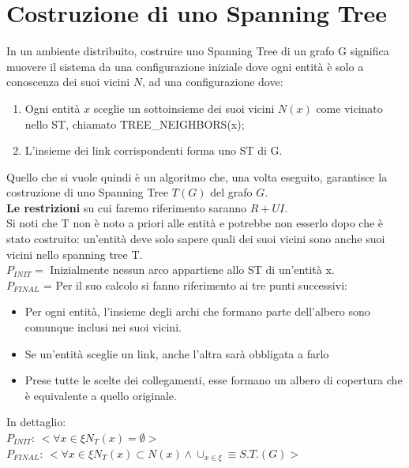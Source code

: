 \chapter{Costruzione di uno Spanning Tree}
In un ambiente distribuito, costruire uno Spanning Tree di un grafo G significa
muovere il sistema da una configurazione iniziale dove ogni entità è solo a
conoscenza dei suoi vicini $N$, ad una configurazione dove:

\begin{enumerate}
    \item Ogni entità $x$ sceglie un sottoinsieme dei suoi vicini $N(x)$ come
          vicinato nello ST, chiamato TREE\_NEIGHBORS(x);
    \item L'insieme dei link corrispondenti forma uno ST di G.
\end{enumerate}

Quello che si vuole quindi è un algoritmo che, una volta eseguito, garantisce la
costruzione di uno Spanning Tree $T(G)$ del grafo $G$.\\
\textbf{Le restrizioni} su cui faremo riferimento saranno $R+UI$.\\
Si noti che T non è noto a priori alle entità e potrebbe non esserlo dopo che è
stato costruito: un'entità deve solo sapere quali dei suoi vicini sono anche
suoi vicini nello spanning tree T.\\
$P_{INIT} = $ Inizialmente nessun arco appartiene allo ST di un'entità x.\\
$P_{FINAL}$ = Per il suo calcolo si fanno riferimento ai tre punti successivi:
\begin{itemize}
    \item Per ogni entità, l'insieme degli archi che formano parte dell'albero
          sono comunque inclusi nei suoi vicini.
    \item Se un'entità sceglie un link, anche l'altra sarà obbligata a farlo
    \item Prese tutte le scelte dei collegamenti, esse formano un albero di
          copertura che è equivalente a quello originale.
\end{itemize}
In dettaglio:\\
$P_{INIT}$: $< \forall x \in \xi N_T(x) = \emptyset >$\\
$P_{FINAL}$: $< \forall x \in \xi N_T(x) \subset N(x) \land \cup_{x \in \xi}
    \equiv S.T.(G)>$

